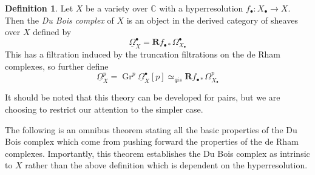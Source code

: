 \documentclass{report}
\theoremstyle{definition}
\newtheorem{definition}[theorem]{Definition}
\DeclareMathOperator{\Gr}{Gr}
\newcommand{\CC}{\mathbb{C}}
\newcommand{\qis}{\simeq_{qis}}
\newcommand{\bR}{\textbf{R}}
\newcommand{\DB}{\underline{\Omega}}
\begin{document}
\begin{definition}
	Let $X$ be a variety over $\CC$ with a hyperresolution $f_\bullet : X_\bullet \rightarrow X$.
	Then the {\it Du Bois complex} of $X$ is an object in the derived category of sheaves over $X$ defined by
	\[
	\DB_X^\bullet = \bR f_{\bullet *} \Omega_{X_\bullet}^\bullet
	\]
	This has a filtration induced by the truncation filtrations on the de Rham complexes, so further define
	\[
	\DB_X^p = \Gr^p \DB_X^\bullet [p] \qis \bR f_{\bullet *} \Omega_{X_\bullet}^p
	\]
\end{definition}

It should be noted that this theory can be developed for pairs, but we are choosing to restrict our attention to the simpler case.

The following is an omnibus theorem stating all the basic properties of the Du Bois complex which come from pushing forward the properties of the de Rham complexes.
Importantly, this theorem establishes the Du Bois complex as intrinsic to $X$ rather than the above definition which is dependent on the hyperresolution.
\end{document}
